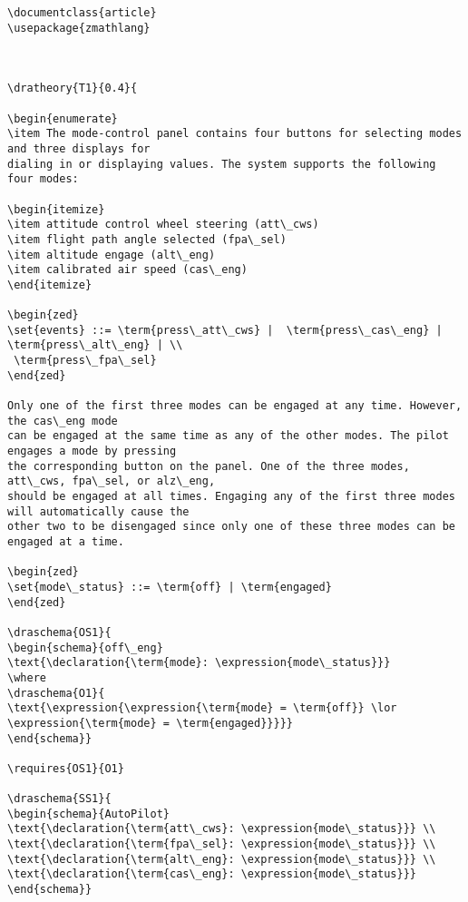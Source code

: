 \begin{verbatim}
\documentclass{article}
\usepackage{zmathlang}



\dratheory{T1}{0.4}{

\begin{enumerate}
\item The mode-control panel contains four buttons for selecting modes and three displays for
dialing in or displaying values. The system supports the following four modes:

\begin{itemize}
\item attitude control wheel steering (att\_cws)
\item flight path angle selected (fpa\_sel)
\item altitude engage (alt\_eng)
\item calibrated air speed (cas\_eng)
\end{itemize}

\begin{zed}
\set{events} ::= \term{press\_att\_cws} |  \term{press\_cas\_eng} | \term{press\_alt\_eng} | \\
 \term{press\_fpa\_sel}
\end{zed}

Only one of the first three modes can be engaged at any time. However, the cas\_eng mode
can be engaged at the same time as any of the other modes. The pilot engages a mode by pressing
the corresponding button on the panel. One of the three modes, att\_cws, fpa\_sel, or alz\_eng,
should be engaged at all times. Engaging any of the first three modes will automatically cause the
other two to be disengaged since only one of these three modes can be engaged at a time.

\begin{zed}
\set{mode\_status} ::= \term{off} | \term{engaged}
\end{zed}

\draschema{OS1}{
\begin{schema}{off\_eng}
\text{\declaration{\term{mode}: \expression{mode\_status}}}
\where
\draschema{O1}{
\text{\expression{\expression{\term{mode} = \term{off}} \lor \expression{\term{mode} = \term{engaged}}}}}
\end{schema}}

\requires{OS1}{O1}

\draschema{SS1}{
\begin{schema}{AutoPilot}
\text{\declaration{\term{att\_cws}: \expression{mode\_status}}} \\
\text{\declaration{\term{fpa\_sel}: \expression{mode\_status}}} \\
\text{\declaration{\term{alt\_eng}: \expression{mode\_status}}} \\
\text{\declaration{\term{cas\_eng}: \expression{mode\_status}}} 
\end{schema}}


\end{verbatim}
